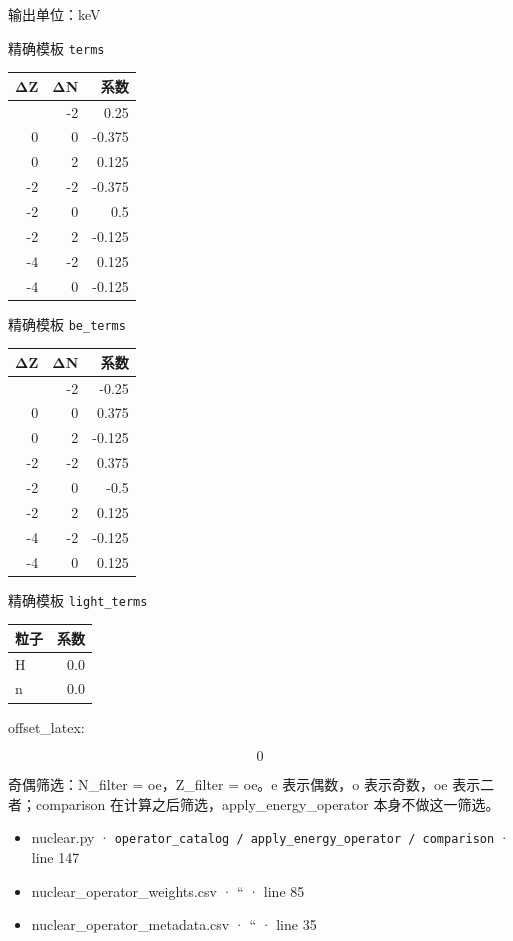 \documentclass[
  11pt,
  letterpaper,
]{article}
\providecommand{\tightlist}{%
  \setlength{\itemsep}{0pt}\setlength{\parskip}{0pt}}
\begin{document}
输出单位：keV

精确模板 \texttt{terms}

\begin{longtable}[]{@{}rrr@{}}
\toprule\noalign{}
ΔZ & ΔN & 系数 \\
\midrule\noalign{}
\endhead
\bottomrule\noalign{}
\endlastfoot
0 & -2 & 0.25 \\
0 & 0 & -0.375 \\
0 & 2 & 0.125 \\
-2 & -2 & -0.375 \\
-2 & 0 & 0.5 \\
-2 & 2 & -0.125 \\
-4 & -2 & 0.125 \\
-4 & 0 & -0.125 \\
\end{longtable}

精确模板 \texttt{be\_terms}

\begin{longtable}[]{@{}rrr@{}}
\toprule\noalign{}
ΔZ & ΔN & 系数 \\
\midrule\noalign{}
\endhead
\bottomrule\noalign{}
\endlastfoot
0 & -2 & -0.25 \\
0 & 0 & 0.375 \\
0 & 2 & -0.125 \\
-2 & -2 & 0.375 \\
-2 & 0 & -0.5 \\
-2 & 2 & 0.125 \\
-4 & -2 & -0.125 \\
-4 & 0 & 0.125 \\
\end{longtable}

精确模板 \texttt{light\_terms}

\begin{longtable}[]{@{}lr@{}}
\toprule\noalign{}
粒子 & 系数 \\
\midrule\noalign{}
\endhead
\bottomrule\noalign{}
\endlastfoot
H & 0.0 \\
n & 0.0 \\
\end{longtable}

offset\_latex:

\[
0
\]

奇偶筛选：N\_filter = oe，Z\_filter = oe。e 表示偶数，o 表示奇数，oe
表示二者；comparison 在计算之后筛选，apply\_energy\_operator
本身不做这一筛选。

\begin{itemize}
\tightlist
\item
  nuclear.py ·
  \texttt{operator\_catalog\ /\ apply\_energy\_operator\ /\ comparison}
  · line 147
\item
  nuclear\_operator\_weights.csv · `` · line 85
\item
  nuclear\_operator\_metadata.csv · `` · line 35
\end{itemize}
\end{document}
